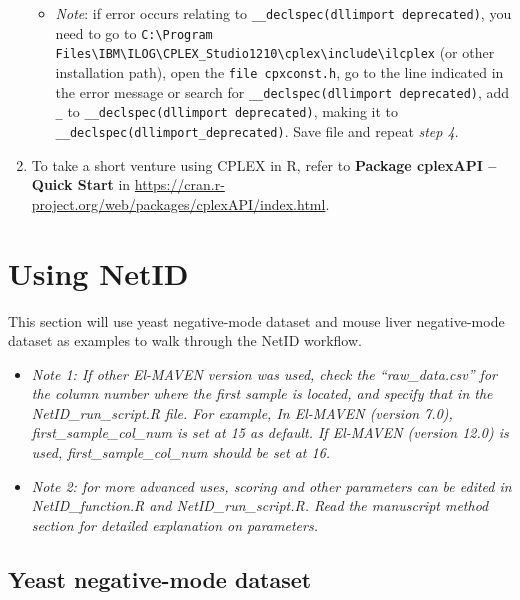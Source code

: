 \documentclass[]{article}
\providecommand{\tightlist}{%
  \setlength{\itemsep}{0pt}\setlength{\parskip}{0pt}}
\begin{document}
\begin{enumerate}
  \begin{itemize}
  \tightlist
  \item
    \emph{Note}: if error occurs relating to \texttt{\_\_declspec(dllimport deprecated)}, you need to go to \texttt{C:\textbackslash{}Program Files\textbackslash{}IBM\textbackslash{}ILOG\textbackslash{}CPLEX\_Studio1210\textbackslash{}cplex\textbackslash{}include\textbackslash{}ilcplex} (or other installation path), open the \texttt{file cpxconst.h}, go to the line indicated in the error message or search for \texttt{\_\_declspec(dllimport deprecated)}, add \texttt{\_} to \texttt{\_\_declspec(dllimport deprecated)}, making it to \texttt{\_\_declspec(dllimport\_deprecated)}. Save file and repeat \emph{step 4}.
  \end{itemize}
\item
  To take a short venture using CPLEX in R, refer to \textbf{Package cplexAPI -- Quick Start} in \url{https://cran.r-project.org/web/packages/cplexAPI/index.html}.
\end{enumerate}

\hypertarget{using-netid}{%
\section{Using NetID}\label{using-netid}}

This section will use yeast negative-mode dataset and mouse liver negative-mode dataset as examples to walk through the NetID workflow.

\begin{itemize}
\tightlist
\item
  \emph{Note 1: If other El-MAVEN version was used, check the ``raw\_data.csv'' for the column number where the first sample is located, and specify that in the NetID\_run\_script.R file. For example, In El-MAVEN (version 7.0), first\_sample\_col\_num is set at 15 as default. If El-MAVEN (version 12.0) is used, first\_sample\_col\_num should be set at 16.}
\item
  \emph{Note 2: for more advanced uses, scoring and other parameters can be edited in NetID\_function.R and NetID\_run\_script.R. Read the manuscript method section for detailed explanation on parameters.}
\end{itemize}

\hypertarget{yeast-negative-mode-dataset}{%
\subsection{Yeast negative-mode dataset}\label{yeast-negative-mode-dataset}}
\end{document}
